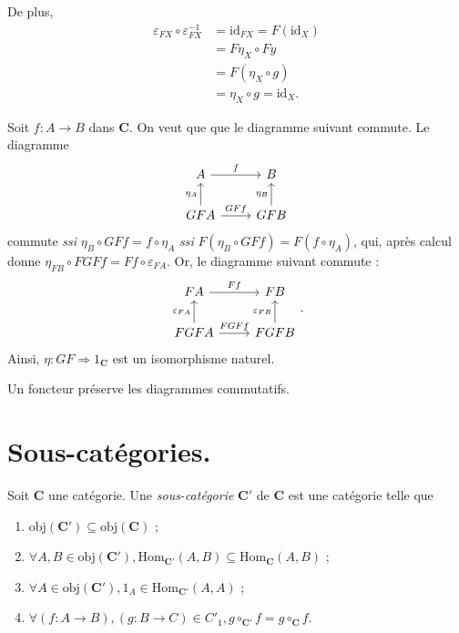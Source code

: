 \begin{prv}
\begin{itemize}
\begin{itemize}
          De plus,
          \begin{align*}
            \varepsilon_{FX} \circ \varepsilon_{FX}^{-1} &= \mathrm{id}_{FX} = F(\mathrm{id}_X)\\
            &= F \eta_X \circ F y \\
            &= F(\eta_X \circ g) \\
            &= \eta_X \circ g = \mathrm{id}_X
          .\end{align*}

          Soit $f : A \to B$ dans $\mathbf{C}$.
          On veut que que le diagramme suivant commute.
          Le diagramme 
          \[
          \begin{tikzcd}
            A \arrow{r}{f} & B\\
            GFA \arrow{u}{\eta_A} \arrow{r}{GFf} & GFB \arrow{u}{\eta_B}
          \end{tikzcd}
          \] commute \textit{ssi} $\eta_B \circ GFf = f \circ \eta_A$ \textit{ssi} $F (\eta_B \circ GFf) = F (f \circ \eta_A)$, qui, après calcul donne $\eta_{FB} \circ FGFf = F f \circ \varepsilon_{FA}$.
          Or, le diagramme suivant commute :
          \[
          \begin{tikzcd}
            FA \arrow{r}{Ff}& FB \\
            FGFA \arrow{u}{\varepsilon_{FA}} \arrow{r}{FGFf} & FGFB \arrow{u}{\varepsilon_{FB}}
          \end{tikzcd}
          .\]
          Ainsi, $\eta : GF \Rightarrow 1_\mathbf{C}$ est un isomorphisme naturel.
      \end{itemize}
  \end{itemize}
\end{prv}

\begin{rmk}
  Un foncteur préserve les diagrammes commutatifs.
\end{rmk}

\section{Sous-catégories.}

\begin{defn}
  Soit $\mathbf{C}$ une catégorie.
  Une \textit{sous-catégorie} $\mathbf{C}'$ de $\mathbf{C}$ est une catégorie telle que 
  \begin{enumerate}
    \item $\mathrm{obj}(\mathbf{C}') \subseteq \mathrm{obj}(\mathbf{C})$ ;
    \item $\forall A, B \in \mathrm{obj}(\mathbf{C}'), \mathrm{Hom}_{\mathbf{C}'}(A,B) \subseteq \mathrm{Hom}_\mathbf{C}(A,B)$ ;
    \item $\forall A \in \mathrm{obj}(\mathbf{C}'), 1_A \in \mathrm{Hom}_{\mathbf{C}'}(A,A)$ ;
    \item $\forall (f : A \to B), (g: B \to C) \in C'_1, g \circ_{\mathbf{C}'} f = g \circ_{\mathbf{C}} f$.
  \end{enumerate}
\end{defn}

